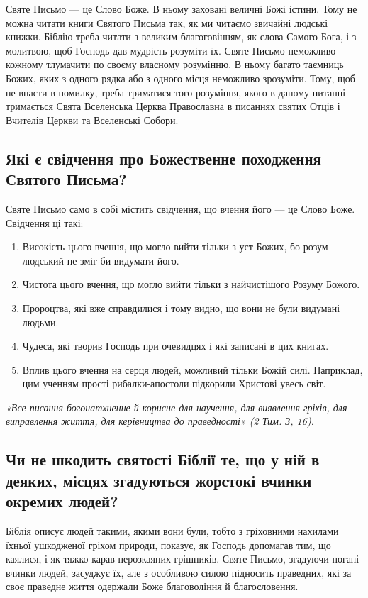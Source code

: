 \documentclass[main.tex]{subfiles}
\begin{document}
Святе Письмо — це Слово Боже. В ньому заховані величні Божі істини. Тому не можна читати книги Святого Письма так, як ми читаємо звичайні людські книжки. Біблію треба читати з великим благоговінням, як слова Самого Бога, і з молитвою, щоб Господь дав мудрість розуміти їх. Святе Письмо неможливо кожному тлумачити по своєму власному розумінню. В ньому багато таємниць Божих, яких з одного рядка або з одного місця неможливо зрозуміти. Тому, щоб не впасти в помилку, треба триматися того розуміння, якого в даному питанні тримається Свята Вселенська Церква Православна в писаннях святих Отців і Вчителів Церкви та Вселенські Собори.

\subsection{Які є свідчення про Божественне походження Святого Письма?}

Святе Письмо само в собі містить свідчення, що вчення його — це Слово Боже. Свідчення ці такі:
\begin{enumerate}
    \item Високість цього вчення, що могло вийти тільки з уст Божих, бо розум людський не зміг би видумати його.
    \item Чистота цього вчення, що могло вийти тільки з найчистішого Розуму Божого.
    \item Пророцтва, які вже справдилися і тому видно, що вони не були видумані людьми.
    \item Чудеса, які творив Господь при очевидцях і які записані в цих книгах.
    \item Вплив цього вчення на серця людей, можливий тільки Божій силі. Наприклад, цим ученням прості рибалки-апостоли підкорили Христові увесь світ.
\end{enumerate}

\begin{FlushRight}
    \emph{«Все писання богонатхненне й корисне для научення, для виявлення гріхів, для виправлення життя, для керівництва до праведності» (2 Тим. З, 16).}
\end{FlushRight}

\subsection{Чи не шкодить святості Біблії те, що у ній в деяких, місцях згадуються жорстокі вчинки окремих людей?}

Біблія описує людей такими, якими вони були, тобто з гріховними нахилами їхньої ушкодженої гріхом природи, показує, як Господь допомагав тим, що каялися, і як тяжко карав нерозкаяних грішників. Святе Письмо, згадуючи погані вчинки людей, засуджує їх, але з особливою силою підносить праведних, які за своє праведне життя одержали Боже благовоління й благословення.
\end{document}
